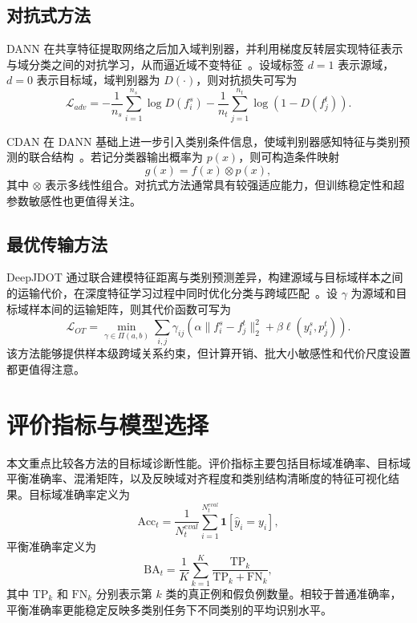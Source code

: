 \subsection{对抗式方法}
DANN 在共享特征提取网络之后加入域判别器，并利用梯度反转层实现特征表示与域分类之间的对抗学习，从而逼近域不变特征~\cite{ganin2016dann}。设域标签 $d=1$ 表示源域，$d=0$ 表示目标域，域判别器为 $D(\cdot)$，则对抗损失可写为
\begin{equation}
\mathcal{L}_{adv}=
-\frac{1}{n_s}\sum_{i=1}^{n_s}\log D(f_i^s)
-\frac{1}{n_t}\sum_{j=1}^{n_t}\log(1-D(f_j^t)).
\end{equation}

CDAN 在 DANN 基础上进一步引入类别条件信息，使域判别器感知特征与类别预测的联合结构~\cite{long2018conditional}。若记分类器输出概率为 $p(x)$，则可构造条件映射
\begin{equation}
g(x)=f(x)\otimes p(x),
\end{equation}
其中 $\otimes$ 表示多线性组合。对抗式方法通常具有较强适应能力，但训练稳定性和超参数敏感性也更值得关注。

\subsection{最优传输方法}
DeepJDOT 通过联合建模特征距离与类别预测差异，构建源域与目标域样本之间的运输代价，在深度特征学习过程中同时优化分类与跨域匹配~\cite{damodaran2018deepjdot}。设 $\gamma$ 为源域和目标域样本间的运输矩阵，则其代价函数可写为
\begin{equation}
\mathcal{L}_{OT}=
\min_{\gamma\in\Pi(a,b)}
\sum_{i,j}\gamma_{ij}
\left(
\alpha\|f_i^s-f_j^t\|_2^2+
\beta\ell(y_i^s,p_j^t)
\right).
\end{equation}
该方法能够提供样本级跨域关系约束，但计算开销、批大小敏感性和代价尺度设置都更值得注意。

\section{评价指标与模型选择}
本文重点比较各方法的目标域诊断性能。评价指标主要包括目标域准确率、目标域平衡准确率、混淆矩阵，以及反映域对齐程度和类别结构清晰度的特征可视化结果。目标域准确率定义为
\begin{equation}
\mathrm{Acc}_{t}=\frac{1}{N_t^{eval}}\sum_{i=1}^{N_t^{eval}}\mathbf{1}[\hat{y}_i=y_i],
\end{equation}
平衡准确率定义为
\begin{equation}
\mathrm{BA}_{t}=\frac{1}{K}\sum_{k=1}^{K}
\frac{\mathrm{TP}_k}{\mathrm{TP}_k+\mathrm{FN}_k},
\end{equation}
其中 $\mathrm{TP}_k$ 和 $\mathrm{FN}_k$ 分别表示第 $k$ 类的真正例和假负例数量。相较于普通准确率，平衡准确率更能稳定反映多类别任务下不同类别的平均识别水平。

